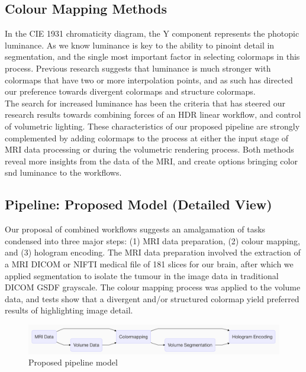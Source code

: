 \subsection{Colour Mapping Methods}
In the CIE 1931 chromaticity diagram, the Y component represents the photopic luminance.  As we know luminance is key to the ability to pinoint detail in segmentation, and the single most important factor in selecting colormaps in this process.  Previous research suggests that luminance is much stronger with colormaps that have two or more interpolation points, and as such has directed our preference towards divergent colormaps and structure colormaps.\\

The search for increased luminance has been the criteria that has steered our research results towards combining forces of an HDR linear workflow, and control of volumetric lighting.  These characteristics of our proposed pipeline are strongly complemented by adding colormaps to the process at either the input stage of MRI data processing or during the volumetric rendering process.  Both methods reveal more insights from the data of the MRI, and create options bringing color snd luminance to the workflows.

\subsection{Pipeline: Proposed Model (Detailed View)}
Our proposal of combined workflows suggests an amalgamation of tasks condensed into three major steps: (1) MRI data preparation, (2) colour mapping, and (3) hologram encoding.  The MRI data preparation involved the extraction of a MRI DICOM or NIFTI medical file of 181 slices for our brain, after which we applied segmentation to isolate the tumour in the image data in traditional DICOM GSDF grayscale.  The colour mapping process was applied to the volume data, and tests show that a divergent and/or structured colormap yield preferred results of highlighting image detail.

\begin{figure}[t]
 \centering %
 \includegraphics[width=\columnwidth]{pictures/proposed-model.png}
 \caption{Proposed pipeline model}
 \label{fig:proposed-model}
\end{figure}

